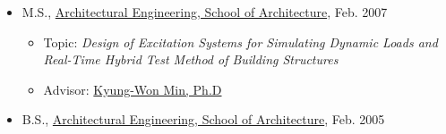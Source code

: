 \documentclass[10pt,a4paper,ragged2e]{altacv}
\begin{document}
\begin{fullwidth}
\begin{itemize}
		\item M.S., \href{http://cms.dankook.ac.kr/web/archi} {Architectural Engineering, School of Architecture}, Feb. 2007
		      \begin{itemize}
			      \item Topic: \emph{Design of Excitation Systems for Simulating Dynamic Loads and Real-Time Hybrid Test Method of Building Structures}
			      \item Advisor: \href{http://cms.dankook.ac.kr/web/archi/-16?p_p_id=DeptInfo_WAR_empInfoportlet&p_p_lifecycle=0&p_p_state=normal&p_p_mode=view&p_p_col_id=column-2&p_p_col_count=1&_DeptInfo_WAR_empInfoportlet_empId=2zEyEnhbhLlys2HRljBFWg%3D%3D&_DeptInfo_WAR_empInfoportlet_action=view_message} {Kyung-Won Min, Ph.D}
		      \end{itemize}
		\item B.S., \href{http://cms.dankook.ac.kr/web/archi}{Architectural Engineering, School of Architecture}, Feb. 2005
	\end{itemize}



\end{fullwidth}
\end{document}
